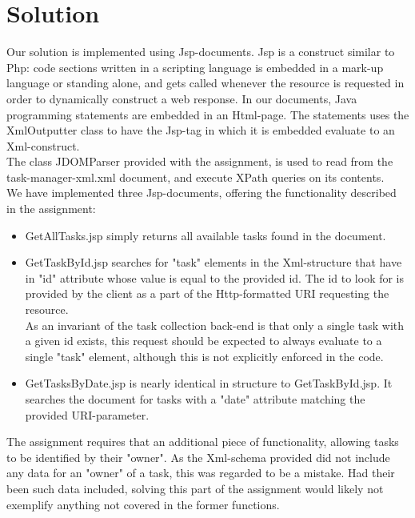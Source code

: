 \documentclass{report}
\begin{document}
	\section{Solution}
	\label{servlet_solution}
	Our solution is implemented using Jsp-documents. Jsp is a construct similar to Php: code sections written in a scripting language is embedded in a mark-up language or standing alone, and gets called whenever the resource is requested in order to dynamically construct a web response. In our documents, Java programming statements are embedded in an Html-page. The statements uses the XmlOutputter class to have the Jsp-tag in which it is embedded evaluate to an Xml-construct.\\
	The class JDOMParser provided with the assignment, is used to read from the task-manager-xml.xml document, and execute XPath queries on its contents.\\
	We have implemented three Jsp-documents, offering the functionality described in the assignment:
	\begin{itemize}
		\item GetAllTasks.jsp simply returns all available tasks found in the document. 
		\item GetTaskById.jsp searches for "task" elements in the Xml-structure that have in "id" attribute whose value is equal to the provided id. The id to look for is provided by the client as a part of the Http-formatted URI requesting the resource.\\
		As an invariant of the task collection back-end is that only a single task with a given id exists, this request should be expected to always evaluate to a single "task" element, although this is not explicitly enforced in the code.
		\item GetTasksByDate.jsp is nearly identical in structure to GetTaskById.jsp. It searches the document for tasks with a "date" attribute matching the provided URI-parameter. 
	\end{itemize}
	The assignment requires that an additional piece of functionality, allowing tasks to be identified by their "owner". As the Xml-schema provided did not include any data for an "owner" of a task, this was regarded to be a mistake. Had their been such data included, solving this part of the assignment would likely not exemplify anything not covered in the former functions. 
	
\end{document}
